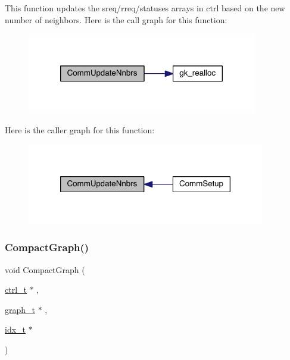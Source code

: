 This function updates the sreq/rreq/statuses arrays in ctrl based on the new number of neighbors. Here is the call graph for this function\+:\nopagebreak
\begin{figure}[H]
\begin{center}
\leavevmode
\includegraphics[width=284pt]{a00951_a245110080c4fe1712c5cac4a52e61e69_cgraph}
\end{center}
\end{figure}
Here is the caller graph for this function\+:\nopagebreak
\begin{figure}[H]
\begin{center}
\leavevmode
\includegraphics[width=294pt]{a00951_a245110080c4fe1712c5cac4a52e61e69_icgraph}
\end{center}
\end{figure}
\mbox{\label{a00951_ab08ce81f951fb9530c0801b737dff551}} 
\subsubsection{\texorpdfstring{Compact\+Graph()}{CompactGraph()}}
{\footnotesize\ttfamily void Compact\+Graph (\begin{DoxyParamCaption}\item[{\hyperlink{a00742}{ctrl\+\_\+t} $\ast$}]{,  }\item[{\hyperlink{a00734}{graph\+\_\+t} $\ast$}]{,  }\item[{\hyperlink{a00876_aaa5262be3e700770163401acb0150f52}{idx\+\_\+t} $\ast$}]{ }\end{DoxyParamCaption})}


